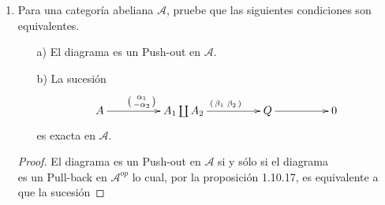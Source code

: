 \documentclass{article}
\newcommand{\spmat}[1]{%
  \left(\begin{smallmatrix}#1\end{smallmatrix}\right)%
}
\begin{document}
\begin{enumerate}[label=\textbf{Ej \arabic*.}]
\begin{proof}
\centerline{
}

en $\mathscr{A}^{op}$ cuyas silas son exactas.\\

Así, $\beta':B'\to C$ es tal que hace conmutar el siguiente diagrama en $\mathscr{A}$, cuyas filas son exactas\\

\centerline{
}

Veamos ahora que se cumple b). Si tenemos un diagrama conmutativo como en (*) con filas exactas en $\mathscr{A}$, entonces tenemos un diagrama
conmutativo con filas exactas en $\mathscr{A}^{op}$ como se muestra en (1). Así, por 1.10.16 $(B',(\alpha')^{op},(\gamma')^{op})$
 es un pull-back de  por lo que $(B',\alpha',\gamma')$ es un push-out de
  en $\mathscr{A}$.

\end{proof}

\item Para una categoría abeliana $\mathscr{A}$, pruebe que las siguientes condiciones son equivalentes.

\begin{itemize}
\item[a)] El diagrama 
es un Push-out en $\mathscr{A}$.

\item[b)] La sucesión \begin{equation*}
\xymatrix@C+2pc{
 A \ar[r]^{\spmat{\alpha_1\\ -\alpha_2}}  & A_1\coprod A_2\ar[r]^{\spmat{\beta_1&\beta_2}}& Q\ar[r]&0}
\end{equation*}
es exacta en  $\mathscr{A}$.
\end{itemize}

\begin{proof}

El diagrama 
es un Push-out en $\mathscr{A}$ si y sólo si el diagrama\\
es un Pull-back en $\mathscr{A}^{op}$ lo cual, por la proposición 1.10.17, es equivalente a que la sucesión 


\end{proof}
\end{enumerate}
\end{document}
